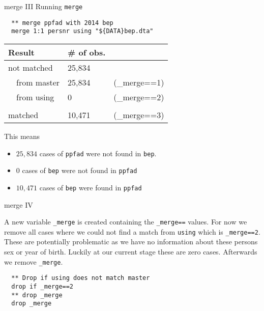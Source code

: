 \begin{frame}[fragile]{merge III}
Running \texttt{merge} 

\begin{lstlisting}
  ** merge ppfad with 2014 bep
  merge 1:1 persnr using "${DATA}bep.dta"
\end{lstlisting}

\begin{table}
\begin{center}
\begin{scriptsize}
\begin{tabular}{lll}
 Result & \# of obs. & \\ 
 \midrule
 not matched & 25,834 & \\
 ~~from master & 25,834  &(\_merge==1) \\
 ~~from using  & 0 &(\_merge==2) \\
 & & \\
 matched & 10,471 & (\_merge==3) \\
 \midrule
\end{tabular}
\end{scriptsize}
\end{center}
\end{table}
This means 
\begin{itemize}
 \item $25,834$ cases of \texttt{ppfad} were not found in \texttt{bep}.
 \item $0$ cases of \texttt{bep} were not found in \texttt{ppfad}
 \item $10,471$ cases of \texttt{bep} were found in \texttt{ppfad}
\end{itemize}
\end{frame}

\begin{frame}[fragile]{merge IV}
\begin{minipage}{11cm}
A new variable \texttt{\_merge} is created containing the \texttt{\_merge==} values. For now we remove all cases where we could not find a match from \texttt{using} which is \texttt{\_merge==2}. These are potentially problematic as we have no information about these persons sex or year of birth. Luckily at our current stage these are zero cases. Afterwards we remove \texttt{\_merge}.
\begin{lstlisting}
  ** Drop if using does not match master
  drop if _merge==2
  ** drop _merge
  drop _merge
\end{lstlisting}
\end{minipage}



\end{frame}

